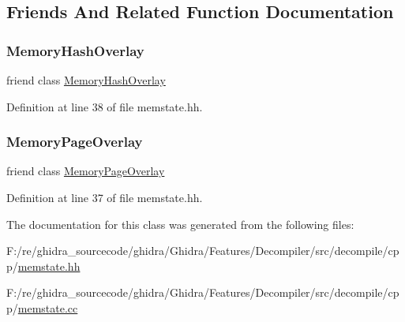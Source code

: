 \subsection{Friends And Related Function Documentation}
\mbox{\label{class_memory_bank_aaef831bed4bde79676024649093dec95}} 
\subsubsection{\texorpdfstring{MemoryHashOverlay}{MemoryHashOverlay}}
{\footnotesize\ttfamily friend class \mbox{\hyperlink{class_memory_hash_overlay}{Memory\+Hash\+Overlay}}\hspace{0.3cm}{\ttfamily [friend]}}



Definition at line 38 of file memstate.\+hh.

\mbox{\label{class_memory_bank_abfa1478e94e6c9f59f450ea1a3394466}} 
\subsubsection{\texorpdfstring{MemoryPageOverlay}{MemoryPageOverlay}}
{\footnotesize\ttfamily friend class \mbox{\hyperlink{class_memory_page_overlay}{Memory\+Page\+Overlay}}\hspace{0.3cm}{\ttfamily [friend]}}



Definition at line 37 of file memstate.\+hh.



The documentation for this class was generated from the following files\+:\begin{DoxyCompactItemize}
\item 
F\+:/re/ghidra\+\_\+sourcecode/ghidra/\+Ghidra/\+Features/\+Decompiler/src/decompile/cpp/\mbox{\hyperlink{memstate_8hh}{memstate.\+hh}}\item 
F\+:/re/ghidra\+\_\+sourcecode/ghidra/\+Ghidra/\+Features/\+Decompiler/src/decompile/cpp/\mbox{\hyperlink{memstate_8cc}{memstate.\+cc}}\end{DoxyCompactItemize}
